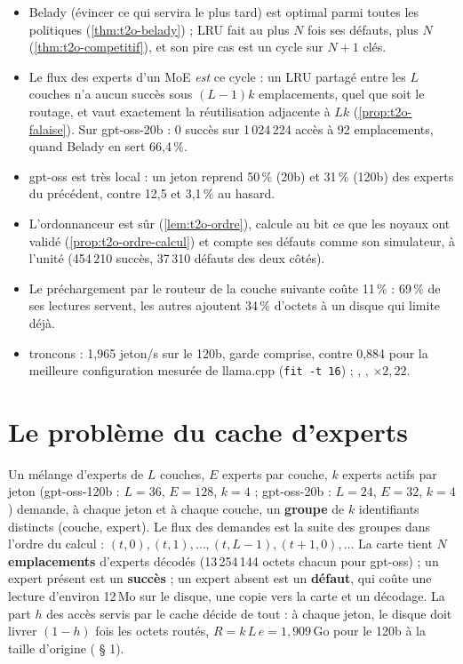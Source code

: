 \begin{enbref}
\begin{itemize}
\item Belady (évincer ce qui servira le plus tard) est optimal parmi toutes les politiques (\cref{thm:t2o-belady}) ; LRU fait au plus $N$ fois ses défauts, plus $N$ (\cref{thm:t2o-competitif}), et son pire cas est un cycle sur $N + 1$ clés.
\item Le flux des experts d'un MoE \emph{est} ce cycle : un LRU partagé entre les $L$ couches n'a aucun succès sous $(L-1)k$ emplacements, quel que soit le routage, et vaut exactement la réutilisation adjacente à $Lk$ (\cref{prop:t2o-falaise}). Sur gpt-oss-20b : 0 succès sur 1\,024\,224 accès à 92 emplacements, quand Belady en sert 66,4\,\%.
\item gpt-oss est très local : un jeton reprend 50\,\% (20b) et 31\,\% (120b) des experts du précédent, contre 12,5 et 3,1\,\% au hasard.
\item L'ordonnanceur est sûr (\cref{lem:t2o-ordre}), calcule au bit ce que les noyaux ont validé (\cref{prop:t2o-ordre-calcul}) et compte ses défauts comme son simulateur, à l'unité (454\,210 succès, 37\,310 défauts des deux côtés).
\item Le préchargement par le routeur de la couche suivante coûte 11\,\% : 69\,\% de ses lectures servent, les autres ajoutent 34\,\% d'octets à un disque qui limite déjà.
\item troncons : 1,965 jeton/s sur le 120b, garde comprise, contre 0,884 pour la meilleure configuration mesurée de llama.cpp (\texttt{fit -t 16}) ; , , $\times 2{,}22$.
\end{itemize}
\end{enbref}

\section{Le problème du cache d'experts}\label{sec:t2o-probleme}

Un mélange d'experts de $L$ couches, $E$ experts par couche, $k$ experts actifs par jeton (gpt-oss-120b : $L = 36$, $E = 128$, $k = 4$ ; gpt-oss-20b : $L = 24$, $E = 32$, $k = 4$) demande, à chaque jeton et à chaque couche, un \textbf{groupe} de $k$ identifiants distincts (couche, expert). Le flux des demandes est la suite des groupes dans l'ordre du calcul : $(t, 0), (t, 1), \ldots, (t, L-1), (t+1, 0), \ldots$ La carte tient $N$ \textbf{emplacements} d'experts décodés (13\,254\,144 octets chacun pour gpt-oss) ; un expert présent est un \textbf{succès} ; un expert absent est un \textbf{défaut}, qui coûte une lecture d'environ 12\,Mo sur le disque, une copie vers la carte et un décodage. La part $h$ des accès servis par le cache décide de tout : à chaque jeton, le disque doit livrer $(1 - h)$ fois les octets routés, $R = k\,L\,e = 1{,}909$\,Go pour le 120b à la taille d'origine ( § 1).

